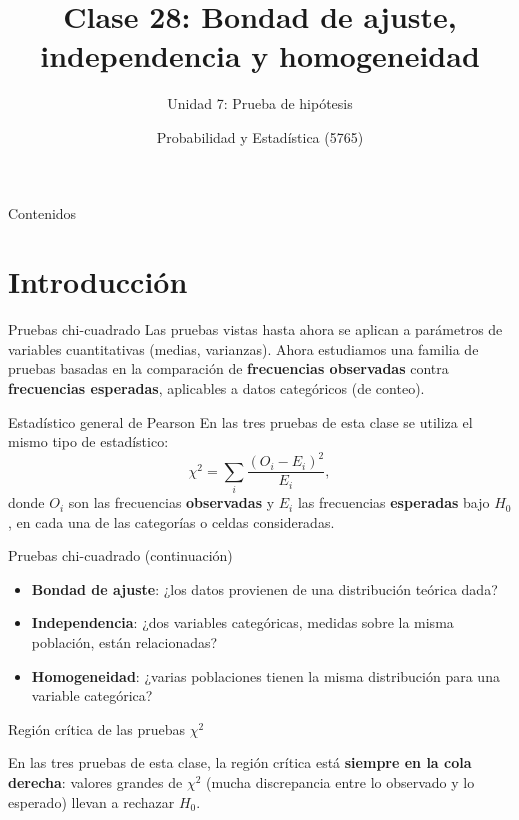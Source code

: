 \documentclass[aspectratio=169,11pt]{beamer}
\title[Prob. y Estadística]{Clase 28: Bondad de ajuste, independencia y homogeneidad}
\subtitle{Unidad 7: Prueba de hipótesis}
\institute[UNS]{Universidad Nacional del Sur \\ Departamento de Matemática}
\author{Probabilidad y Estadística (5765)}
\date{}
\begin{document}
\begin{frame}
\titlepage
\end{frame}

\begin{frame}{Contenidos}
\tableofcontents
\end{frame}

\section{Introducción}

\begin{frame}{Pruebas chi-cuadrado}
Las pruebas vistas hasta ahora se aplican a parámetros de variables cuantitativas (medias, varianzas). Ahora estudiamos una familia de pruebas basadas en la comparación de \textbf{frecuencias observadas} contra \textbf{frecuencias esperadas}, aplicables a datos categóricos (de conteo).

\begin{block}{Estadístico general de Pearson}
En las tres pruebas de esta clase se utiliza el mismo tipo de estadístico:
\[
\chi^2 = \sum_{i} \frac{(O_i-E_i)^2}{E_i},
\]
donde $O_i$ son las frecuencias \textbf{observadas} y $E_i$ las frecuencias \textbf{esperadas} bajo $H_0$, en cada una de las categorías o celdas consideradas.
\end{block}

\end{frame}

\begin{frame}{Pruebas chi-cuadrado (continuación)}
\begin{itemize}
\item \textbf{Bondad de ajuste}: ¿los datos provienen de una distribución teórica dada?
\item \textbf{Independencia}: ¿dos variables categóricas, medidas sobre la misma población, están relacionadas?
\item \textbf{Homogeneidad}: ¿varias poblaciones tienen la misma distribución para una variable categórica?
\end{itemize}
\end{frame}

\begin{frame}{Región crítica de las pruebas $\chi^2$}
\centering
{}
\vspace{0.2cm}

En las tres pruebas de esta clase, la región crítica está \textbf{siempre en la cola derecha}: valores grandes de $\chi^2$ (mucha discrepancia entre lo observado y lo esperado) llevan a rechazar $H_0$.
\end{frame}
\end{document}
